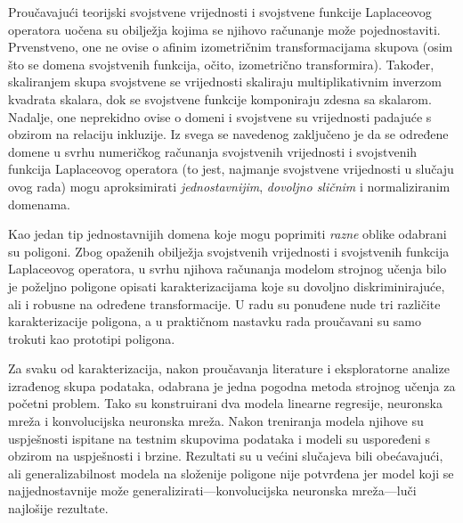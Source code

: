 \begin{sazetak}
    Proučavajući teorijski svojstvene vrijednosti i svojstvene funkcije Laplaceovog operatora uočena su obilježja kojima se njihovo računanje može pojednostaviti. Prvenstveno, one ne ovise o afinim izometričnim transformacijama skupova (osim što se domena svojstvenih funkcija, očito, izometrično transformira). Također, skaliranjem skupa svojstvene se vrijednosti skaliraju multiplikativnim inverzom kvadrata skalara, dok se svojstvene funkcije komponiraju zdesna sa skalarom. Nadalje, one neprekidno ovise o domeni i svojstvene su vrijednosti padajuće s obzirom na relaciju inkluzije. Iz svega se navedenog zaključeno je da se određene domene u svrhu numeričkog računanja svojstvenih vrijednosti i svojstvenih funkcija Laplaceovog operatora (to jest, najmanje svojstvene vrijednosti u slučaju ovog rada) mogu aproksimirati \emph{jednostavnijim}, \emph{dovoljno sličnim} i normaliziranim domenama.

    \par

    Kao jedan tip jednostavnijih domena koje mogu poprimiti \emph{razne} oblike odabrani su poligoni. Zbog opaženih obilježja svojstvenih vrijednosti i svojstvenih funkcija Laplaceovog operatora, u svrhu njihova računanja modelom strojnog učenja bilo je poželjno poligone opisati karakterizacijama koje su dovoljno diskriminirajuće, ali i robusne na određene transformacije. U radu su ponuđene nude tri različite karakterizacije poligona, a u praktičnom nastavku rada proučavani su samo trokuti kao prototipi poligona.

    \par

    Za svaku od karakterizacija, nakon proučavanja literature i eksploratorne analize izrađenog skupa podataka, odabrana je jedna pogodna metoda strojnog učenja za početni problem. Tako su konstruirani dva modela linearne regresije, neuronska mreža i konvolucijska neuronska mreža. Nakon treniranja modela njihove su uspješnosti ispitane na testnim skupovima podataka i modeli su uspoređeni s obzirom na uspješnosti i brzine. Rezultati su u većini slučajeva bili obećavajući, ali generalizabilnost modela na složenije poligone nije potvrđena jer model koji se najjednostavnije može generalizirati---konvolucijska neuronska mreža---luči najlošije rezultate.

    \par
\end{sazetak}
